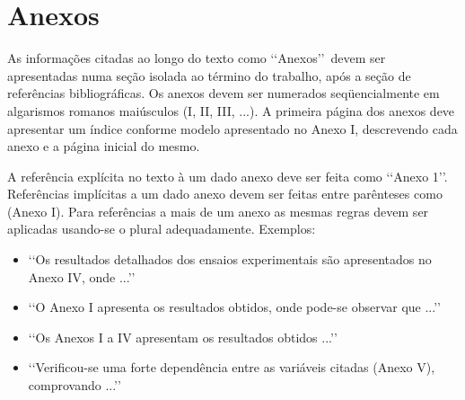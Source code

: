 \section{Anexos}

As informações citadas ao longo do texto como \lq\lq Anexos\rq\rq\ devem ser 
apresentadas numa seção isolada ao término do trabalho, após a seção de 
referências bibliográficas. Os anexos devem ser numerados seqüencialmente em 
algarismos romanos maiúsculos (I, II, III, ...). A primeira página dos anexos 
deve apresentar um índice conforme modelo apresentado no Anexo I, descrevendo 
cada anexo e a página inicial do mesmo.

A referência explícita no texto à um dado anexo deve ser feita como 
\lq\lq Anexo 1\rq\rq. Referências implícitas a um dado anexo devem ser feitas 
entre parênteses como (Anexo I). Para referências a mais de um anexo as mesmas 
regras devem ser aplicadas usando-se o plural adequadamente. Exemplos:
\begin{itemize}
	\item \lq\lq Os resultados detalhados dos ensaios experimentais são 
	apresentados no Anexo IV, onde ...\rq\rq

	\item \lq\lq O Anexo I apresenta os resultados obtidos, onde pode-se 
	observar que ...\rq\rq

	\item \lq\lq Os Anexos I a IV apresentam os resultados obtidos ...\rq\rq

	\item \lq\lq Verificou-se uma forte dependência entre as variáveis citadas 
	(Anexo V), comprovando ...\rq\rq
\end{itemize}

